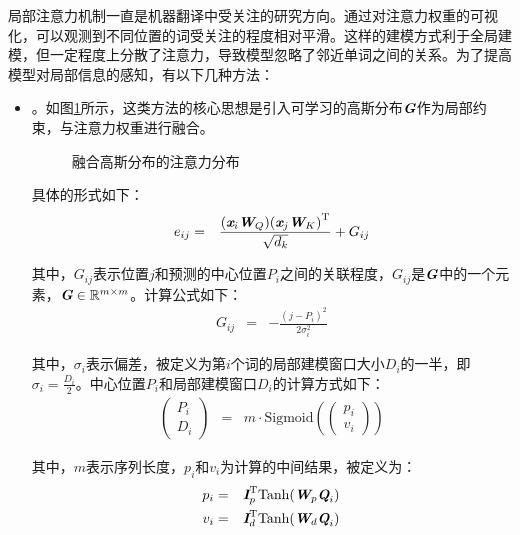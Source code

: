 \parinterval 局部注意力机制一直是机器翻译中受关注的研究方向。通过对注意力权重的可视化，可以观测到不同位置的词受关注的程度相对平滑。这样的建模方式利于全局建模，但一定程度上分散了注意力，导致模型忽略了邻近单词之间的关系。为了提高模型对局部信息的感知，有以下几种方法：

\begin{itemize}
\vspace{0.5em}
\item {\small{}}。如图\ref{fig:15-3}所示，这类方法的核心思想是引入可学习的高斯分布$\textbf{\em G}$作为局部约束，与注意力权重进行融合。

\begin{figure}[htp]
\centering

\caption{融合高斯分布的注意力分布}
\label{fig:15-3}
\end{figure}

\noindent 具体的形式如下：
\begin{eqnarray}
e_{ij} &=& \frac{(\textbf{\em x}_i \textbf{\em W}_Q){(\textbf{\em x}_j \textbf{\em W}_K)}^{\textrm{T}}}{\sqrt{d_k}} + G_{ij}
\label{eq:15-15}
\end{eqnarray}

\noindent 其中，$G_{ij}$表示位置$j$和预测的中心位置$P_i$之间的关联程度，$G_{ij}$是$\textbf{\em G}$中的一个元素，$\textbf{\em G} \in \mathbb{R}^{m\times m}$。计算公式如下：
\begin{eqnarray}
G_{ij} &=& - \frac{{(j - P_i)}^2}{2\sigma_i^2}
\label{eq:15-16}
\end{eqnarray}

\noindent 其中，$\sigma_i$表示偏差，被定义为第$i$个词的局部建模窗口大小$D_i$的一半，即$\sigma_i = \frac{D_i}{2}$。中心位置$P_i$和局部建模窗口$D_i$的计算方式如下：
\begin{eqnarray}
\begin{pmatrix} P_i \\ D_i \end{pmatrix} &=& m \cdot \textrm{Sigmoid}(\begin{pmatrix} p_i \\ v_i \end{pmatrix})
\label{eq:15-17}
\end{eqnarray}

\noindent 其中，$m$表示序列长度，$p_i$和$v_i$为计算的中间结果，被定义为：
\begin{eqnarray}
p_i &=& \textbf{\em I}_p^{\textrm{T}}\textrm{Tanh}(\textbf{\em W}_p\textbf{\em Q}_i) \\
v_i &=& \textbf{\em I}_d^{\textrm{T}}\textrm{Tanh}(\textbf{\em W}_d\textbf{\em Q}_i)
\label{eq:15-19}
\end{eqnarray}


\end{itemize}
